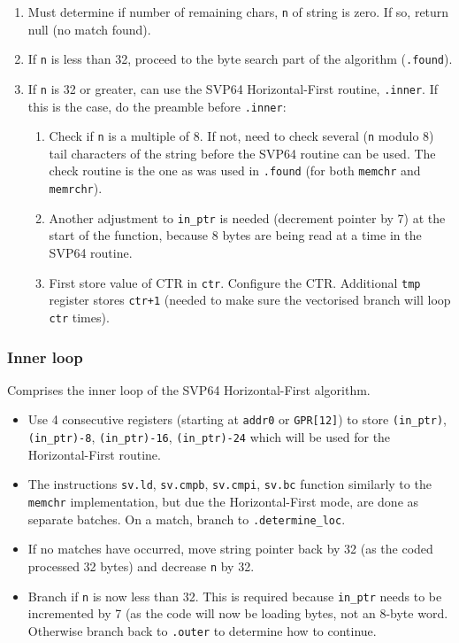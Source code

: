 \begin{enumerate}
  \item Must determine if number of remaining chars, \texttt{n} of
  string is zero. If so, return null (no match found).
  \item If \texttt{n} is less than 32, proceed to the byte search part of
  the algorithm (\texttt{.found}).
  \item If \texttt{n} is 32 or greater, can use the SVP64 Horizontal-First
  routine, \texttt{.inner}. If this is the case, do the preamble
  before \texttt{.inner}:
  \begin{enumerate}
    \item Check if \texttt{n} is a multiple of 8. If not, need to check
    several (\texttt{n} modulo 8) tail characters of the string before the
    SVP64 routine can be used. The check routine is the one as was used in
    \texttt{.found} (for both \texttt{memchr} and \texttt{memrchr}).
    \item Another adjustment to \texttt{in\_ptr} is needed (decrement pointer
    by 7) at the start of the function, because 8 bytes are being read at
    a time in the SVP64 routine.
    \item First store value of \acrshort{CTR} in \texttt{ctr}.
    Configure the \acrshort{CTR}. Additional \texttt{tmp} register stores
    \texttt{ctr+1} (needed to make sure the vectorised branch will loop
    \texttt{ctr} times).
  \end{enumerate}
\end{enumerate}

\subsubsection{Inner loop}

Comprises the inner loop of the SVP64 Horizontal-First algorithm.

\begin{itemize}
  \item Use 4 consecutive registers (starting at \texttt{addr0} or
  \texttt{GPR[12]}) to store \texttt{(in\_ptr)}, \texttt{(in\_ptr)-8},
  \texttt{(in\_ptr)-16}, \texttt{(in\_ptr)-24} which will be used for
  the Horizontal-First routine.
  \item The instructions \texttt{sv.ld}, \texttt{sv.cmpb}, \texttt{sv.cmpi},
  \texttt{sv.bc} function similarly to the \texttt{memchr} implementation,
  but due the Horizontal-First mode, are done as separate batches.
  On a match, branch to \texttt{.determine\_loc}.
  \item If no matches have occurred, move string pointer back by 32 (as the
  coded processed 32 bytes) and decrease \texttt{n} by 32.
  \item Branch if \texttt{n} is now less than 32. This is required because
  \texttt{in\_ptr} needs to be incremented by 7 (as the code will now be
  loading bytes, not an 8-byte word. Otherwise branch back to \texttt{.outer}
  to determine how to continue.
\end{itemize}


